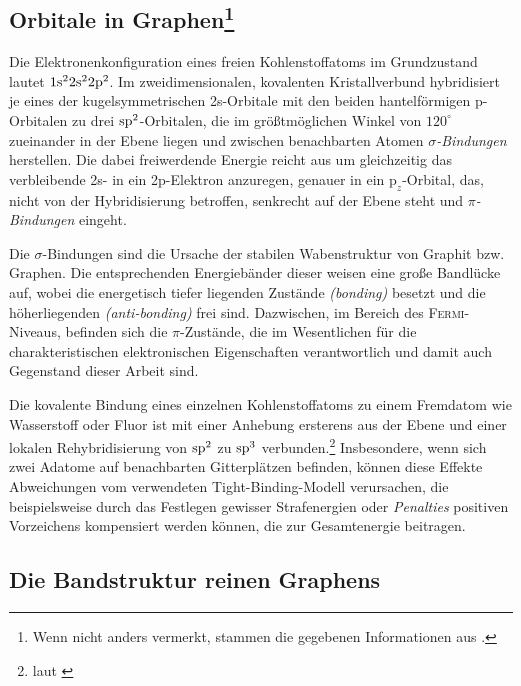 \documentclass[a4paper, 10pt, twoside, openany]{book} %
\begin{document}
	\subsection[Orbitale in Graphen]{Orbitale in Graphen\footnote{Wenn nicht anders vermerkt, stammen die gegebenen Informationen aus \cite[S.~1, 2, 5 u. 7]{Katsnelson1}.}}
	\label{Orbitale in Graphen}
	
	Die Elektronenkonfiguration eines freien Kohlenstoffatoms im Grundzustand lautet $\rm 1s^2 2s^2 2p^2$. Im zweidimensionalen, kovalenten Kristallverbund hybridisiert je eines der kugelsymmetrischen 2s-Orbitale mit den beiden hantelförmigen p-Orbitalen zu drei $\rm sp^2$-Orbitalen, die im größtmöglichen Winkel von $120^\circ$ zueinander in der Ebene liegen und zwischen benachbarten Atomen \emph{$\sigma$-Bindungen} herstellen. Die dabei freiwerdende Energie reicht aus um gleichzeitig das verbleibende 2s- in ein 2p-Elektron anzuregen, genauer in ein $\mathrm p_z$-Orbital, das, nicht von der Hybridisierung betroffen, senkrecht auf der Ebene steht und \emph{$\pi$-Bindungen} eingeht.
	
	Die $\sigma$-Bindungen sind die Ursache der stabilen Wabenstruktur von Graphit bzw. Graphen. Die entsprechenden Energiebänder dieser weisen eine große Bandlücke auf, wobei die energetisch tiefer liegenden Zustände \emph{(bonding)} besetzt und die höherliegenden \emph{(anti-bonding)} frei sind. Dazwischen, im Bereich des \textsc{Fermi}-Niveaus, befinden sich die $\pi$-Zustände, die im Wesentlichen für die charakteristischen elektronischen Eigenschaften verantwortlich und damit auch Gegenstand dieser Arbeit sind.
	
	Die kovalente Bindung eines einzelnen Kohlenstoffatoms zu einem Fremdatom wie Wasserstoff oder Fluor ist mit einer Anhebung ersterens aus der Ebene und einer lokalen Rehybridisierung von $\rm sp^2$ zu $\rm sp^3$ verbunden.\footnote{laut \cite[S.~1]{Wehling2}} Insbesondere, wenn sich zwei Adatome auf benachbarten Gitterplätzen befinden, können diese Effekte Abweichungen vom verwendeten Tight-Binding-Modell verursachen, die beispielsweise durch das Festlegen gewisser Strafenergien oder \emph{Penalties} positiven Vorzeichens kompensiert werden können, die zur Gesamtenergie beitragen.
	
	\subsection{Die Bandstruktur reinen Graphens}
	
\end{document}
